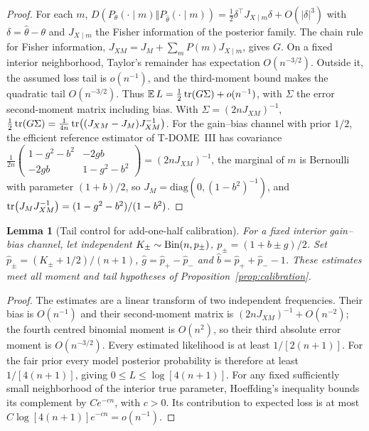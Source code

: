 \documentclass[12pt]{article}
\newtheorem{lemma}[theorem]{Lemma}
\begin{document}
\begin{proof}
For each $m$, $D(P_\theta(\cdot\mid m)\Vert P_{\hat\theta}(\cdot\mid m))=\tfrac12\delta^{\top}J_{X\mid m}\delta+O(|\delta|^3)$ with $\delta=\hat\theta-\theta$ and $J_{X\mid m}$ the Fisher information of the posterior family. The chain rule for Fisher information, $J_{XM}=J_M+\sum_mP(m)J_{X\mid m}$, gives $G$. On a fixed interior neighborhood, Taylor's remainder has expectation $O(n^{-3/2})$. Outside it, the assumed loss tail is $o(n^{-1})$, and the third-moment bound makes the quadratic tail $O(n^{-3/2})$. Thus $\mathbb E\,L=\tfrac12\tr(G\Sigma)+o(n^{-1})$, with $\Sigma$ the error second-moment matrix including bias. With $\Sigma=(2nJ_{XM})^{-1}$, $\tfrac12\tr(G\Sigma)=\tfrac1{4n}\tr\bigl((J_{XM}-J_M)J_{XM}^{-1}\bigr)$. For the gain--bias channel with prior $1/2$, the efficient reference estimator of T-DOME~III has covariance $\tfrac1{2n}\begin{pmatrix}1-g^2-b^2&-2gb\\-2gb&1-g^2-b^2\end{pmatrix}=(2nJ_{XM})^{-1}$, the marginal of $m$ is Bernoulli with parameter $(1+b)/2$, so $J_M=\mathrm{diag}(0,(1-b^2)^{-1})$, and $\tr(J_MJ_{XM}^{-1})=(1-g^2-b^2)/(1-b^2)$.
\end{proof}

\begin{lemma}[Tail control for add-one-half calibration]
\label{lem:addhalf}
For a fixed interior gain--bias channel, let independent
$K_\pm\sim{\rm Bin}(n,p_\pm)$, $p_\pm=(1+b\pm g)/2$.
Set $\hat p_\pm=(K_\pm+1/2)/(n+1)$,
$\hat g=\hat p_+-\hat p_-$ and $\hat b=\hat p_++\hat p_--1$.
These estimates meet all moment and tail hypotheses of
Proposition~\ref{prop:calibration}.
\end{lemma}
\begin{proof}
The estimates are a linear transform of two independent frequencies.
Their bias is $O(n^{-1})$ and their second-moment matrix is
$(2nJ_{XM})^{-1}+O(n^{-2})$; the fourth centred binomial moment
is $O(n^2)$, so their third absolute error moment is $O(n^{-3/2})$.
Every estimated likelihood is at least $1/[2(n+1)]$.
For the fair prior every model posterior probability is therefore
at least $1/[4(n+1)]$, giving $0\le L\le\log[4(n+1)]$.
For any fixed sufficiently small neighborhood of the interior true
parameter, Hoeffding's inequality bounds its complement by
$C e^{-cn}$, with $c>0$. Its contribution to expected loss is at most
$C\log[4(n+1)]e^{-cn}=o(n^{-1})$.
\end{proof}
\end{document}
